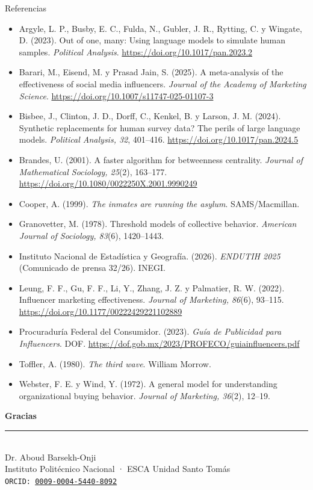 \documentclass[aspectratio=169,xcolor=dvipsnames]{beamer}
\begin{document}
\begin{frame}{Referencias}
\tiny
\begin{itemize}
  \item[] Argyle, L. P., Busby, E. C., Fulda, N., Gubler, J. R., Rytting, C. y Wingate, D. (2023). Out of one, many: Using language models to simulate human samples. \textit{Political Analysis}. \url{https://doi.org/10.1017/pan.2023.2}
  \item[] Barari, M., Eisend, M. y Prasad Jain, S. (2025). A meta-analysis of the effectiveness of social media influencers. \textit{Journal of the Academy of Marketing Science}. \url{https://doi.org/10.1007/s11747-025-01107-3}
  \item[] Bisbee, J., Clinton, J. D., Dorff, C., Kenkel, B. y Larson, J. M. (2024). Synthetic replacements for human survey data? The perils of large language models. \textit{Political Analysis, 32}, 401--416. \url{https://doi.org/10.1017/pan.2024.5}
  \item[] Brandes, U. (2001). A faster algorithm for betweenness centrality. \textit{Journal of Mathematical Sociology, 25}(2), 163--177. \url{https://doi.org/10.1080/0022250X.2001.9990249}
  \item[] Cooper, A. (1999). \textit{The inmates are running the asylum}. SAMS/Macmillan.
  \item[] Granovetter, M. (1978). Threshold models of collective behavior. \textit{American Journal of Sociology, 83}(6), 1420--1443.
  \item[] Instituto Nacional de Estadística y Geografía. (2026). \textit{ENDUTIH 2025} (Comunicado de prensa 32/26). INEGI.
  \item[] Leung, F. F., Gu, F. F., Li, Y., Zhang, J. Z. y Palmatier, R. W. (2022). Influencer marketing effectiveness. \textit{Journal of Marketing, 86}(6), 93--115. \url{https://doi.org/10.1177/00222429221102889}
  \item[] Procuraduría Federal del Consumidor. (2023). \textit{Guía de Publicidad para Influencers}. DOF. \url{https://dof.gob.mx/2023/PROFECO/guiainfluencers.pdf}
  \item[] Toffler, A. (1980). \textit{The third wave}. William Morrow.
  \item[] Webster, F. E. y Wind, Y. (1972). A general model for understanding organizational buying behavior. \textit{Journal of Marketing, 36}(2), 12--19.
\end{itemize}
\end{frame}

\begin{frame}
    \begin{center}
        {\Large \textcolor{IPNguinda}{\textbf{Gracias}}}\\[6pt]
        {\color{IPNdorado}\rule{0.4\linewidth}{1.2pt}}\\[6pt]
        Dr. Aboud Barsekh-Onji \\
        \small Instituto Politécnico Nacional · ESCA Unidad Santo Tomás \\
        \small \texttt{ORCID: \href{https://orcid.org/0009-0004-5440-8092}{0009-0004-5440-8092}}
    \end{center}
\end{frame}
\end{document}
